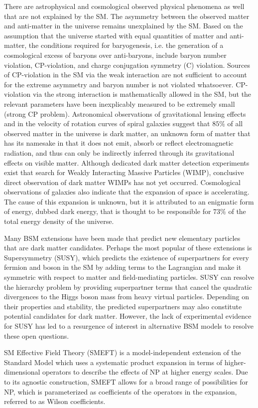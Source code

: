 There are astrophysical and cosmological observed physical phenomena as well that are not explained by the SM.
The asymmetry between the observed matter and anti-matter in the universe remains unexplained by the SM.
Based on the assumption that the universe started with equal quantities of matter and anti-matter, the conditions required for baryogenesis, i.e. the generation of a cosmological excess of baryons over anti-baryons, include baryon number violation, CP-violation, and charge conjugation symmetry (C) violation.
Sources of CP-violation in the SM via the weak interaction are not sufficient to account for the extreme asymmetry and baryon number is not violated whatsoever.
CP-violation via the strong interaction is mathematically allowed in the SM, but the relevant parameters have been inexplicably measured to be extremely small (strong CP problem).
Astronomical observations of gravitational lensing effects and in the velocity of rotation curves of spiral galaxies suggest that $85 \%$ of all observed matter in the universe is dark matter, an unknown form of matter that has its namesake in that it does not emit, absorb or reflect electromagnetic radiation, and thus can only be indirectly inferred through its gravitational effects on visible matter.
Although dedicated dark matter detection experiments exist that search for Weakly Interacting Massive Particles (WIMP), conclusive direct observation of dark matter WIMPs has not yet occurred.
Cosmological observations of galaxies also indicate that the expansion of space is accelerating.
The cause of this expansion is unknown, but it is attributed to an enigmatic form of energy, dubbed dark energy, that is thought to be responsible for $73 \%$ of the total energy density of the universe.

Many BSM extensions have been made that predict new elementary particles that are dark matter candidates.
Perhaps the most popular of these extensions is Supersymmetry (SUSY), which predicts the existence of superpartners for every fermion and boson in the SM by adding terms to the Lagrangian and make it symmetric with respect to matter and field-mediating particles.
SUSY can resolve the hierarchy problem by providing superpartner terms that cancel the quadratic divergences to the Higgs boson mass from heavy virtual particles.
Depending on their properties and stability, the predicted superpartners may also constitute potential candidates for dark matter.
However, the lack of experimental evidence for SUSY has led to a resurgence of interest in alternative BSM models to resolve these open questions.

SM Effective Field Theory (SMEFT) is a model-independent extension of the Standard Model which uses a systematic product expansion in terms of higher-dimensional operators to describe the effects of NP at higher energy scales.  
Due to its agnostic construction, SMEFT allows for a broad range of possibilities for NP, which is parameterized as coefficients of the operators in the expansion, referred to as Wilson coefficients.